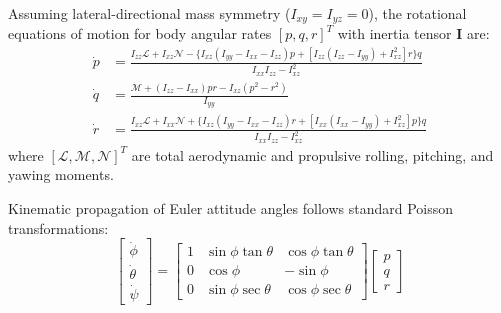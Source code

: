 \documentclass[review,12pt]{elsarticle}
\begin{document}
Assuming lateral-directional mass symmetry ($I_{xy} = I_{yz} = 0$), the rotational equations of motion for body angular rates $[p, q, r]^T$ with inertia tensor $\bm{I}$ are:
\begin{align}
    \dot{p} &= \frac{I_{zz} \mathcal{L} + I_{xz} \mathcal{N} - \{I_{xz}(I_{yy} - I_{xx} - I_{zz})p + [I_{zz}(I_{zz} - I_{yy}) + I_{xz}^2]r\}q}{I_{xx} I_{zz} - I_{xz}^2} \label{eq:p_dot} \\
    \dot{q} &= \frac{\mathcal{M} + (I_{zz} - I_{xx})pr - I_{xz}(p^2 - r^2)}{I_{yy}} \label{eq:q_dot} \\
    \dot{r} &= \frac{I_{xz} \mathcal{L} + I_{xx} \mathcal{N} + \{I_{xz}(I_{yy} - I_{xx} - I_{zz})r + [I_{xx}(I_{xx} - I_{yy}) + I_{xz}^2]p\}q}{I_{xx} I_{zz} - I_{xz}^2} \label{eq:r_dot}
\end{align}
where $[\mathcal{L}, \mathcal{M}, \mathcal{N}]^T$ are total aerodynamic and propulsive rolling, pitching, and yawing moments.

Kinematic propagation of Euler attitude angles follows standard Poisson transformations:
\begin{equation}
\begin{bmatrix} \dot{\phi} \\ \dot{\theta} \\ \dot{\psi} \end{bmatrix} = 
\begin{bmatrix} 
1 & \sin\phi \tan\theta & \cos\phi \tan\theta \\
0 & \cos\phi & -\sin\phi \\
0 & \sin\phi \sec\theta & \cos\phi \sec\theta
\end{bmatrix}
\begin{bmatrix} p \\ q \\ r \end{bmatrix}
\end{equation}
\end{document}
